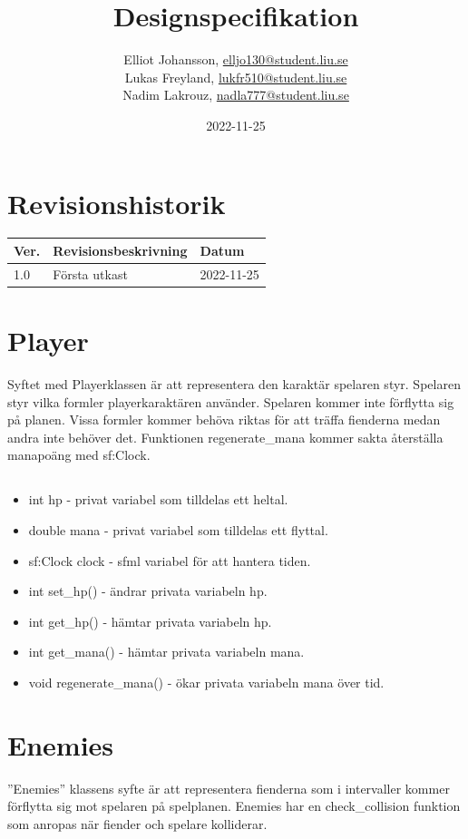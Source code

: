 \documentclass{TDP005mall}
\author{Elliot Johansson, \url{elljo130@student.liu.se}\\
  Lukas Freyland, \url{lukfr510@student.liu.se}\\
  Nadim Lakrouz, \url{nadla777@student.liu.se}}
\title{Designspecifikation}
\date{2022-11-25}
\begin{document}
\projectpage
\section{Revisionshistorik}
\begin{table}[!h]
  \begin{tabularx}{\linewidth}{|l|X|l|}
    \hline
    Ver. & Revisionsbeskrivning & Datum \\\hline

    1.0 & Första utkast & 2022-11-25 \\\hline
  \end{tabularx}
\end{table}

\section{Player}

Syftet med Playerklassen är att representera den karaktär spelaren styr. Spelaren styr vilka formler playerkaraktären använder. Spelaren kommer inte förflytta sig på planen. Vissa formler kommer behöva riktas för att träffa fienderna medan andra inte behöver det.
Funktionen regenerate\_mana kommer sakta återställa manapoäng med sf:Clock.

\subsection{}

\begin{itemize}
\item int hp - privat variabel som tilldelas ett heltal. 
\item double mana - privat variabel som tilldelas ett flyttal. 
\item sf:Clock clock - sfml variabel för att hantera tiden.
\item int set\_hp() - ändrar privata variabeln hp.
\item int get\_hp() - hämtar privata variabeln hp.
\item int get\_mana() - hämtar privata variabeln mana.
\item void regenerate\_mana() - ökar privata variabeln mana över tid.
  
\end{itemize}


\section{Enemies}
''Enemies'' klassens syfte är att representera fienderna som i intervaller kommer förflytta sig mot spelaren på spelplanen. Enemies har en check\_collision funktion som anropas när fiender och spelare kolliderar.
\end{document}
